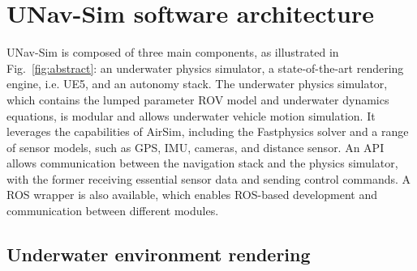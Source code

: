 \section{UNav-Sim software architecture} \label{sec:description}


UNav-Sim is composed of three main components, as illustrated in Fig.~\ref{fig:abstract}: an underwater physics simulator, a state-of-the-art rendering engine, i.e. \ac{UE5}, and an autonomy stack. The underwater physics simulator, which contains the lumped parameter \ac{ROV} model and underwater dynamics equations, is modular and allows underwater vehicle motion simulation. %
It leverages the capabilities of AirSim, including the Fastphysics solver and a range of sensor models, such as GPS, IMU, cameras, and distance sensor. %
An API allows communication between the navigation stack and the physics simulator, with the former receiving essential sensor data and sending control commands. A \ac{ROS} wrapper is also available, which enables \ac{ROS}-based development and communication between different modules.






\subsection{Underwater environment rendering}





